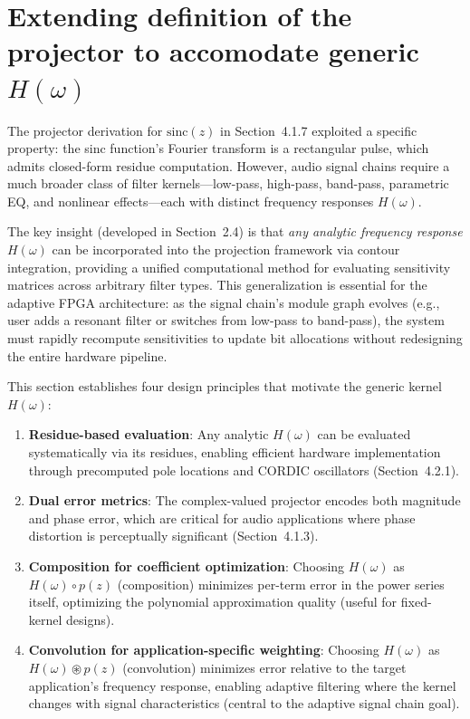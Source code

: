 \section{Extending definition of the projector to accomodate generic $H(\omega)$}

The projector derivation for $\mathrm{sinc}(z)$ in Section~4.1.7 exploited a specific property: the sinc function's Fourier transform is a rectangular pulse, which admits closed-form residue computation. However, audio signal chains require a much broader class of filter kernels—low-pass, high-pass, band-pass, parametric EQ, and nonlinear effects—each with distinct frequency responses $H(\omega)$.

The key insight (developed in Section~2.4) is that \emph{any analytic frequency response} $H(\omega)$ can be incorporated into the projection framework via contour integration, providing a unified computational method for evaluating sensitivity matrices across arbitrary filter types. This generalization is essential for the adaptive FPGA architecture: as the signal chain's module graph evolves (e.g., user adds a resonant filter or switches from low-pass to band-pass), the system must rapidly recompute sensitivities to update bit allocations without redesigning the entire hardware pipeline.

This section establishes four design principles that motivate the generic kernel $H(\omega)$:

\begin{enumerate}
\item \textbf{Residue-based evaluation}: Any analytic $H(\omega)$ can be evaluated systematically via its residues, enabling efficient hardware implementation through precomputed pole locations and CORDIC oscillators (Section~4.2.1).

\item \textbf{Dual error metrics}: The complex-valued projector encodes both magnitude and phase error, which are critical for audio applications where phase distortion is perceptually significant (Section~4.1.3).

\item \textbf{Composition for coefficient optimization}: Choosing $H(\omega)$ as $H(\omega) \circ p(z)$ (composition) minimizes per-term error in the power series itself, optimizing the polynomial approximation quality (useful for fixed-kernel designs).

\item \textbf{Convolution for application-specific weighting}: Choosing $H(\omega)$ as $H(\omega) \circledast p(z)$ (convolution) minimizes error relative to the target application's frequency response, enabling adaptive filtering where the kernel changes with signal characteristics (central to the adaptive signal chain goal).
\end{enumerate}

